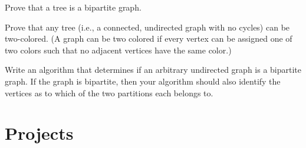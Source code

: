 \begin{exercises}
\item
Prove that a tree is a bipartite graph.

\item
Prove that any tree (i.e., a connected, undirected graph with no
cycles) can be two-colored.
(A graph can be two colored if every vertex can be assigned one of two
colors such that no adjacent vertices have the same color.)

\item
Write an algorithm that determines if an arbitrary undirected graph
is a bipartite graph.
If the graph is bipartite, then your algorithm should also identify
the vertices as to which of the two partitions each belongs to.

\end{exercises}

\section{Projects}

